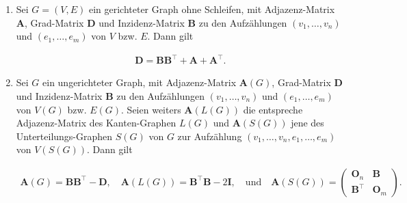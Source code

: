         \begin{proposition} \label{prop:incidence_matrix}

            \begin{enumerate}[
                label = \arabic*.,
                wide,
                labelindent = 0pt
            ]

                \item Sei $G = (V, E)$ ein gerichteter Graph ohne Schleifen, mit Adjazenz-Matrix $\mathbf A$, Grad-Matrix $\mathbf D$ und Inzidenz-Matrix $\mathbf B$ zu den Aufzählungen $(v_1, \dots, v_n)$ und $(e_1, \dots, e_m)$ von $V$ bzw. $E$.
                Dann gilt
    
                \begin{align*}
                    \mathbf D
                    =
                    \mathbf B \mathbf B^\top + \mathbf A + \mathbf A^\top.
                \end{align*}

                \item Sei $G$ ein ungerichteter Graph, mit Adjazenz-Matrix $\mathbf A(G)$, Grad-Matrix $\mathbf D$ und Inzidenz-Matrix $\mathbf B$ zu den Aufzählungen $(v_1, \dots, v_n)$ und $(e_1, \dots, e_m)$ von $V(G)$ bzw. $E(G)$.
                Seien weiters $\mathbf A(L(G))$ die entspreche Adjazenz-Matrix des Kanten-Graphen $L(G)$ und $\mathbf A(S(G))$ jene des Unterteilungs-Graphen $S(G)$ von $G$ zur Aufzählung $(v_1, \dots, v_n, e_1, \dots, e_m)$ von $V(S(G))$.
                Dann gilt

                \begin{align*}
                    \mathbf A(G)
                    =
                    \mathbf B \mathbf B^\top - \mathbf D,
                    \quad
                    \mathbf A(L(G))
                    =
                    \mathbf B^\top \mathbf B - 2 \mathbf I,
                    \quad
                    \text{und}
                    \quad
                    \mathbf A(S(G))
                    =
                    \begin{pmatrix}
                        \mathbf O_n    & \mathbf B \\
                        \mathbf B^\top & \mathbf O_m
                    \end{pmatrix}.
                \end{align*}

            \end{enumerate}

        \end{proposition}

